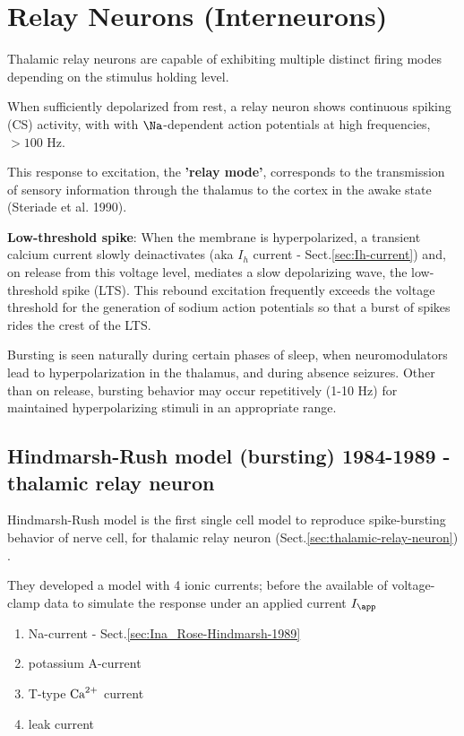 \chapter{Relay Neurons (Interneurons)}
\label{chap:RelayNeurons}
\label{chap:interneurons}

Thalamic relay neurons are capable of exhibiting multiple
distinct firing modes depending on the stimulus
holding level.

When sufficiently depolarized from rest, a relay neuron shows continuous spiking
(CS) activity, with with $\Na$-dependent action potentials at high frequencies,
$>	100$ Hz. 

This response to excitation, the {\bf 'relay mode'}, corresponds to the
transmission of sensory information through the thalamus to the cortex in the
awake state (Steriade et al. 1990).

{\bf Low-threshold spike}:
When the membrane is hyperpolarized, a transient calcium current slowly
deinactivates (aka $I_h$ current - Sect.\ref{sec:Ih-current}) and, on release
from this voltage level, mediates a slow depolarizing wave, the low-threshold
spike (LTS). This rebound excitation frequently exceeds the voltage threshold
for the generation of sodium action potentials so that a burst of spikes rides
the crest of the LTS.

Bursting is seen naturally during certain phases of sleep, when neuromodulators
lead to hyperpolarization in the thalamus, and during absence seizures.
Other than on release, bursting behavior may occur repetitively (1-10 Hz) for
maintained hyperpolarizing stimuli in an appropriate range.


\section{Hindmarsh-Rush model (bursting) 1984-1989 - thalamic relay neuron}
\label{sec:Hindmarsh-Rush_model}
\label{sec:Rose-Hindmarsh-1989}

Hindmarsh-Rush model is the first single cell model to reproduce spike-bursting
behavior of nerve cell, for thalamic relay neuron
(Sect.\ref{sec:thalamic-relay-neuron}) \citep{hindmarsh1984}.


They developed a model with 4 ionic currents; before the available of
voltage-clamp data to simulate the response under an applied current $I_\app$
\begin{enumerate}
  \item Na-current - Sect.\ref{sec:Ina_Rose-Hindmarsh-1989}
  \item potassium A-current
  \item T-type ${\text{Ca}^{2+}}$ current
  \item leak current
\end{enumerate}

